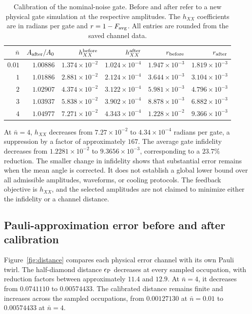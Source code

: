 \documentclass[a4paper,11pt]{article}
\begin{document}
\begin{table}[htbp]
\centering
\caption{Calibration of the nominal-noise gate. Before and after
refer to a new physical gate simulation at the respective amplitudes.
The $h_{XX}$ coefficients are in radians per gate and $r=1-F_{\rm avg}$.
All entries are rounded from the saved channel data.}
\label{tab:calibration}
\small
\begin{tabular}{rrrrrr}
\toprule
$\bar n$ & $A_{\rm after}/A_0$ &
$h_{XX}^{\rm before}$ & $h_{XX}^{\rm after}$ &
$r_{\rm before}$ & $r_{\rm after}$\\
\midrule
$0.01$ & $1.00886$ & $1.374\times10^{-2}$ & $1.024\times10^{-4}$ & $1.947\times10^{-3}$ & $1.819\times10^{-3}$\\
$1$ & $1.01886$ & $2.881\times10^{-2}$ & $2.124\times10^{-4}$ & $3.644\times10^{-3}$ & $3.104\times10^{-3}$\\
$2$ & $1.02907$ & $4.374\times10^{-2}$ & $3.122\times10^{-4}$ & $5.981\times10^{-3}$ & $4.796\times10^{-3}$\\
$3$ & $1.03937$ & $5.838\times10^{-2}$ & $3.902\times10^{-4}$ & $8.878\times10^{-3}$ & $6.882\times10^{-3}$\\
$4$ & $1.04977$ & $7.271\times10^{-2}$ & $4.343\times10^{-4}$ & $1.228\times10^{-2}$ & $9.366\times10^{-3}$\\
\bottomrule
\end{tabular}
\end{table}

At $\bar n=4$, $h_{XX}$ decreases from $7.27\times10^{-2}$ to
$4.34\times10^{-4}$ radians per gate, a suppression by a factor of
approximately $167$. The average gate infidelity decreases from
$1.2281\times10^{-2}$ to $9.3656\times10^{-3}$, corresponding to a
$23.7\%$ reduction. The smaller change in infidelity shows that
substantial error remains when the mean angle is corrected. It does
not establish a global lower bound over all admissible amplitudes,
waveforms, or cooling protocols. The feedback objective is $h_{XX}$,
and the selected amplitudes are not claimed to minimize either the
infidelity or a channel distance.

\subsection{Pauli-approximation error before and after calibration}

Figure~\ref{fig:distance} compares each physical error channel with its
own Pauli twirl. The half-diamond distance $\epsilon_{\rm P}$ decreases
at every sampled occupation, with reduction factors between approximately
$11.4$ and $12.9$. At $\bar n=4$, it decreases from $0.0741110$ to
$0.00574433$. The calibrated distance remains finite and increases
across the sampled occupations, from $0.00127130$ at $\bar n=0.01$
to $0.00574433$ at $\bar n=4$.
\end{document}
